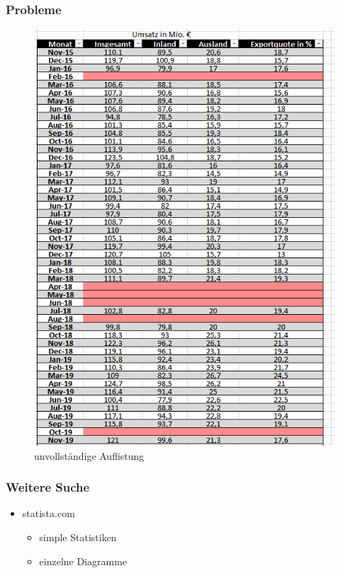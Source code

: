 \documentclass{beamer}
\begin{document}
\begin{frame}
	\frametitle{Probleme}
	\begin{figure}[h]
		\caption{unvollständige Auflistung}
		\centering
		\includegraphics[scale=0.3]{4_Monatsberichte_unvoll}
	\end{figure}
\end{frame}

\begin{frame}
	\frametitle{Weitere Suche}
	\begin{itemize}
		\item statista.com
			\begin{itemize}
				\item simple Statistiken
				\item einzelne Diagramme
			\end{itemize}
	\end{itemize}
\end{frame}
\end{document}
